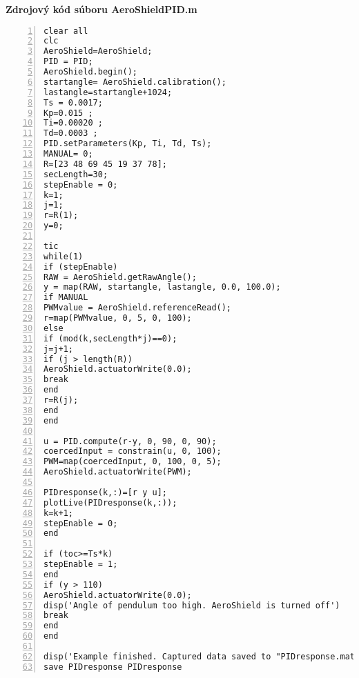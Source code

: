 \LARGE\bf{Zdrojový kód súboru AeroShieldPID.m}
\label{AeroShieldPID.m}
\vspace{1cm}
\begin{lstlisting}[numbers=left,basicstyle=\scriptsize,caption={Zdrojový kód súboru AeroShieldPID.m.},captionpos=b]	
clear all
clc 
AeroShield=AeroShield; 
PID = PID;
AeroShield.begin();
startangle= AeroShield.calibration(); 
lastangle=startangle+1024; 
Ts = 0.0017;   
Kp=0.015 ;
Ti=0.00020 ;
Td=0.0003 ;  
PID.setParameters(Kp, Ti, Td, Ts);
MANUAL= 0;
R=[23 48 69 45 19 37 78];
secLength=30; 
stepEnable = 0;  
k=1; 
j=1;
r=R(1);
y=0;      

tic 
while(1) 
if (stepEnable) 
RAW = AeroShield.getRawAngle();
y = map(RAW, startangle, lastangle, 0.0, 100.0);
if MANUAL  
PWMvalue = AeroShield.referenceRead(); 
r=map(PWMvalue, 0, 5, 0, 100);
else 
if (mod(k,secLength*j)==0); 
j=j+1; 
if (j > length(R)) 
AeroShield.actuatorWrite(0.0); 
break  
end
r=R(j); 
end
end

u = PID.compute(r-y, 0, 90, 0, 90); 
coercedInput = constrain(u, 0, 100); 
PWM=map(coercedInput, 0, 100, 0, 5); 
AeroShield.actuatorWrite(PWM); 

PIDresponse(k,:)=[r y u];
plotLive(PIDresponse(k,:)); 
k=k+1;  
stepEnable = 0; 
end      

if (toc>=Ts*k)      
stepEnable = 1;            
end
if (y > 110)        
AeroShield.actuatorWrite(0.0); 
disp('Angle of pendulum too high. AeroShield is turned off')
break                     
end
end   

disp('Example finished. Captured data saved to "PIDresponse.mat" file.')
save PIDresponse PIDresponse     
\end{lstlisting}